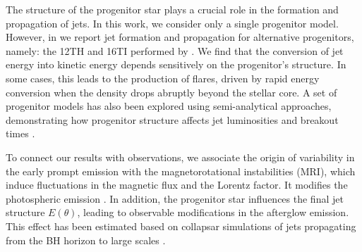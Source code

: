 \documentclass{ptapap}
\begin{document}

The structure of the progenitor star plays a crucial role in the formation and propagation of jets. In this work, we consider only a single progenitor model. However, in \citet{Urrutia2025Collapsar} we report jet formation and propagation for alternative progenitors, namely: the 12TH and 16TI performed by \citet{WoosleyHeger_2006}. We find that the conversion of jet energy into kinetic energy depends sensitively on the progenitor’s structure. In some cases, this leads to the production of flares, driven by rapid energy conversion when the density drops abruptly beyond the stellar core. A set of progenitor models has also been explored using semi-analytical approaches, demonstrating how progenitor structure affects jet luminosities and breakout times \citep{Morales-Rivera2025}. 



To connect our results with observations, we associate the origin of variability in the early prompt emission with the magnetorotational instabilities (MRI), which induce fluctuations in the magnetic flux and the Lorentz factor. It modifies the photospheric emission \citep[e.g.,][]{lopezcamara2016}. In addition, the progenitor star influences the final jet structure $E(\theta)$, leading to observable modifications in the afterglow emission. This effect has been estimated based on collapsar simulations of jets propagating from the BH horizon to large scales \citep[e.g.,][]{Urrutia2025Collapsar}.
\end{document}
